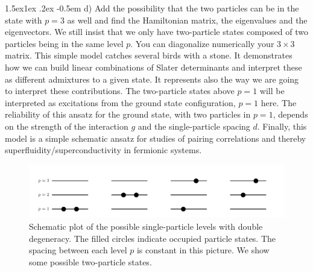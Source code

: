 \documentclass[%
twoside,                 %
final,                   %
10pt]{article}
\makeatletter
\newenvironment{doconceexercise}{}{}
\newcommand\subex{\@startsection{paragraph}{4}{\z@}%
                  {1.5ex\@plus1ex \@minus.2ex}%
                  {-0.5em}%
                  {\normalfont\normalsize\bfseries}}
\makeatother
\begin{document}
\begin{doconceexercise}
\subex{d)}
Add the possibility that the two particles can be in the state with $p=3$ as well and find the Hamiltonian matrix, the eigenvalues and the eigenvectors. We still insist that we only have two-particle states composed of two particles being in the same level $p$. You can diagonalize numerically your $3\times 3$ matrix.
This simple model catches several birds with a stone. It demonstrates how we can build linear combinations
of Slater determinants and interpret these as different admixtures to a given state. It represents also the way we are going to interpret these contributions.  The two-particle states above $p=1$ will be interpreted as 
excitations from the ground state configuration, $p=1$ here.  The reliability of this ansatz for the ground state, 
with two particles in $p=1$,
depends on the strength of the interaction $g$ and the single-particle spacing $d$.
Finally, this model is a simple schematic ansatz for studies of pairing correlations and thereby superfluidity/superconductivity  
in fermionic systems. 


\begin{figure}[t]
  \centerline{\includegraphics[width=0.6\linewidth]{fig-intro/simplemodel.png}}
  \caption{
  Schematic plot of the possible single-particle levels with double degeneracy. The filled circles indicate occupied particle states. The spacing between each level $p$ is constant in this picture. We show some possible two-particle states.
  }
\end{figure}



\end{doconceexercise}




\printindex
\end{document}
